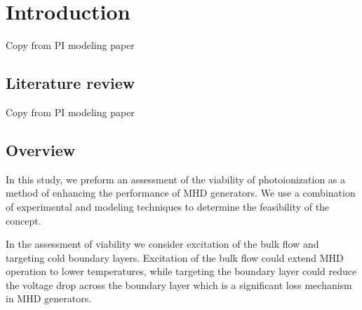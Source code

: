 

\section{Introduction}

Copy from PI modeling paper

\subsection{Literature review}

Copy from PI modeling paper

\subsection{Overview}

In this study, we preform an assessment of the viability of photoionization as a method of enhancing the performance of MHD generators. We use a combination of experimental and modeling techniques to determine the feasibility of the concept. 

In the assessment of viability we consider excitation of the bulk flow and targeting cold boundary layers. Excitation of the bulk flow could extend MHD operation to lower temperatures, while targeting the boundary layer could reduce the voltage drop across the boundary layer which is a significant loss mechanism in MHD generators.



